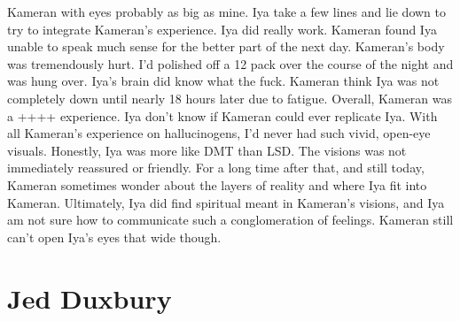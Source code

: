 \documentclass[12pt]{book}
\begin{document}
Kameran with eyes probably as big as mine. Iya take a few lines and lie down to try to integrate Kameran's experience. Iya did really work. Kameran found Iya unable to speak much sense for the better part of the next day. Kameran's body was tremendously hurt. I'd polished off a 12 pack over the course of the night and was hung over. Iya's brain did know what the fuck. Kameran think Iya was not completely down until nearly 18 hours later due to fatigue. Overall, Kameran was a ++++ experience. Iya don't know if Kameran could ever replicate Iya. With all Kameran's experience on hallucinogens, I'd never had such vivid, open-eye visuals. Honestly, Iya was more like DMT than LSD. The visions was not immediately reassured or friendly. For a long time after that, and still today, Kameran sometimes wonder about the layers of reality and where Iya fit into Kameran. Ultimately, Iya did find spiritual meant in Kameran's visions, and Iya am not sure how to communicate such a conglomeration of feelings. Kameran still can't open Iya's eyes that wide though.



\chapter{Jed Duxbury}
\end{document}
